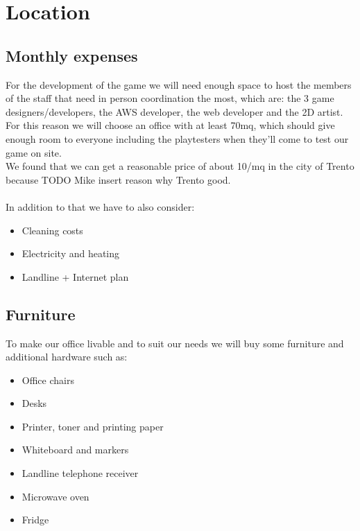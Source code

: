 \section{Location}
\label{section:location}

\subsection{Monthly expenses}
For the development of the game we will need enough space to host the members of the staff that need in person coordination the most, which are: the 3 game designers/developers, the AWS developer, the web developer and the 2D artist. For this reason we will choose an office with at least 70mq, which should give enough room to everyone including the playtesters when they'll come to test our game on site. \\
We found that we can get a reasonable price of about 10\texteuro/mq in the city of Trento because TODO Mike insert reason why Trento good. \\\\
In addition to that we have to also consider:
\begin{itemize}
	\item Cleaning costs
	\item Electricity and heating
	\item Landline + Internet plan
\end{itemize}

\subsection{Furniture}

To make our office livable and to suit our needs we will buy some furniture and additional hardware such as:
\begin{itemize}
	\item Office chairs 
	\item Desks
	\item Printer, toner and printing paper
	\item Whiteboard and markers
	\item Landline telephone receiver
	\item Microwave oven
	\item Fridge
\end{itemize} 

\pagebreak 
